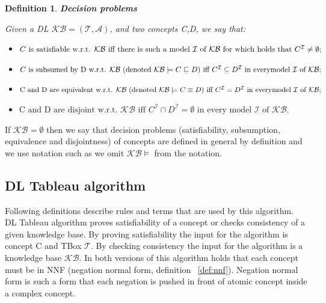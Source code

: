 \documentclass[12pt,a4paper]{article}
\newtheorem{definition}{Definition}[subsection]
\begin{document}
\begin{definition}{\textbf{Decision problems}}

	Given a DL $\mathcal{KB} = (\mathcal{T}, \mathcal{A})$, and two concepts C,D, we say that:

	\begin{itemize}
		\item $C \text{ is satisfiable w.r.t. } \mathcal{KB} \text{ iff there is such a model } \mathcal{I} \text{ of } \mathcal{KB} \text{ for which holds that } \newline C^{\mathcal{I}} \neq \emptyset;$

		\item $C \text{ is subsumed by D w.r.t. } \mathcal{KB} \text{ (denoted } \mathcal{KB} \models C \sqsubseteq D) \text{ iff } C^{\mathcal{I}} \subseteq D^{\mathcal{I}} \text{ in every} \newline \text{model } \mathcal{I} \text{ of } \mathcal{KB};$

		\item $\text{C and D are equivalent w.r.t. } \mathcal{KB} \text{ (denoted } \mathcal{KB} \models C \equiv D) \text{ iff } C^{\mathcal{I}} = D^{\mathcal{I}} \text{ in every} \newline \text{model } \mathcal{I} \text{ of } \mathcal{KB};$
		
		\item $\text{C and D are disjoint w.r.t. } \mathcal{KB} \text{ iff } C^{\mathcal{I}} \cap D^{\mathcal{I}} = \emptyset \text{ in every model } \mathcal{I} \text{ of } \mathcal{KB}.$		
	\end{itemize}
\end{definition}

If $\mathcal{KB} = \emptyset$ then we say that decision problems (satisfiability, subsumption, equivalence and disjointness) of concepts are defined in general by definition and we use notation such as we omit $\mathcal{KB} \models$ from the notation.

\subsection{DL Tableau algorithm}
Following definitions \citep{baaderHandbook} describe rules and terms that are used by this algorithm. DL Tableau algorithm proves satisfiability of a concept or checks consistency of a given knowledge base. By proving satisfiability the input for the algorithm is concept C and TBox $\mathcal{T}$. By checking consistency the input for the algorithm is a knowledge base $\mathcal{KB}$. In both versions of this algorithm holds that each concept must be in NNF (negation normal form, definition ~\ref{def:nnf}). Negation normal form is such a form that each negation is pushed in front of atomic concept inside a complex concept. 
\end{document}
